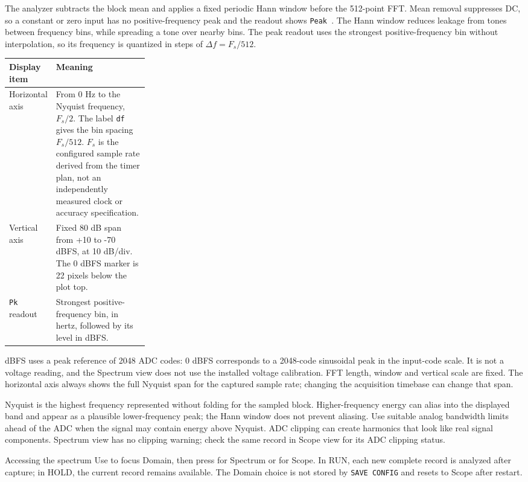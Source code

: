\documentclass[10pt,a4paper]{article}
\newcommand{\key}[1]{\mbox{\fcolorbox{line}{white}{\strut\footnotesize\bfseries #1}}}
\newcommand{\lcd}[1]{\texttt{#1}}
\begin{document}
The analyzer subtracts the block mean and applies a fixed periodic Hann window before the 512-point FFT. Mean removal suppresses DC, so a constant or zero input has no positive-frequency peak and the readout shows \lcd{Peak \kern0pt\char45}. The Hann window reduces leakage from tones between frequency bins, while spreading a tone over nearby bins. The peak readout uses the strongest positive-frequency bin without interpolation, so its frequency is quantized in steps of \(\Delta f = F_s/512\).

\begin{tabularx}{\linewidth}{@{}p{0.27\linewidth}X@{}}
\toprule
Display item & Meaning \\
\midrule
Horizontal axis & From 0 Hz to the Nyquist frequency, \(F_s/2\). The label \lcd{df} gives the bin spacing \(F_s/512\). \(F_s\) is the configured sample rate derived from the timer plan, not an independently measured clock or accuracy specification. \\
Vertical axis & Fixed 80 dB span from +10 to -70 dBFS, at 10 dB/div. The 0 dBFS marker is 22 pixels below the plot top. \\
\lcd{Pk} readout & Strongest positive-frequency bin, in hertz, followed by its level in dBFS. \\
\bottomrule
\end{tabularx}

dBFS uses a peak reference of 2048 ADC codes: 0 dBFS corresponds to a 2048-code sinusoidal peak in the input-code scale. It is not a voltage reading, and the Spectrum view does not use the installed voltage calibration. FFT length, window and vertical scale are fixed. The horizontal axis always shows the full Nyquist span for the captured sample rate; changing the acquisition timebase can change that span.

Nyquist is the highest frequency represented without folding for the sampled block. Higher-frequency energy can alias into the displayed band and appear as a plausible lower-frequency peak; the Hann window does not prevent aliasing. Use suitable analog bandwidth limits ahead of the ADC when the signal may contain energy above Nyquist. ADC clipping can create harmonics that look like real signal components. Spectrum view has no clipping warning; check the same record in Scope view for its ADC clipping status.

\begin{manualnote}{Accessing the spectrum}
Use \key{SEL} to focus Domain, then press \key{+} for Spectrum or \key{\char45} for Scope. In RUN, each new complete record is analyzed after capture; in HOLD, the current record remains available. The Domain choice is not stored by \lcd{SAVE CONFIG} and resets to Scope after restart.
\end{manualnote}
\end{document}
